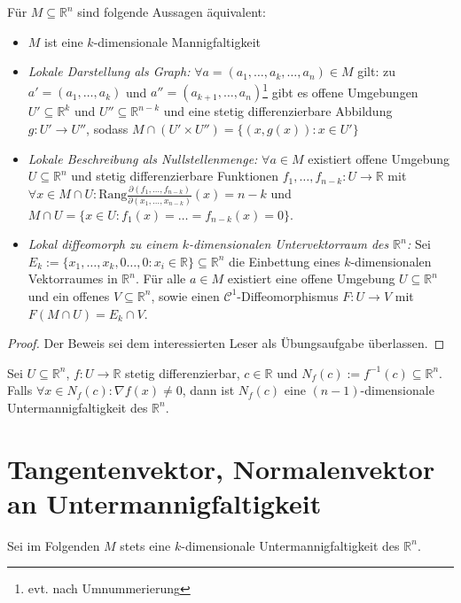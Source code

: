 \begin{theorem}
	F\"ur $M\subseteq \mathbb R^n$ sind folgende Aussagen \"aquivalent:
	
	\begin{itemize}
		\item $M$ ist eine $k$-dimensionale Mannigfaltigkeit
		\item \textit{Lokale Darstellung als Graph:} $\forall a=(a_1,\dots,a_k,\dots,a_n)\in M$ gilt: zu $a'=(a_1,\dots,a_k)$ und $a''=(a_{k+1},\dots,a_n)$\footnote{evt. nach Umnummerierung} gibt es offene Umgebungen $U'\subseteq \mathbb R^k$ und $U''\subseteq \mathbb R^{n-k}$ und eine stetig differenzierbare Abbildung $g:U'\rightarrow U''$, sodass $M\cap (U'\times U'') = \{(x,g(x)): x\in U'\}$
		\item \textit{Lokale Beschreibung als Nullstellenmenge:} $\forall a\in M$ existiert offene Umgebung $U\subseteq \mathbb R^n$ und stetig differenzierbare Funktionen $f_1,\dots,f_{n-k}:U\rightarrow \mathbb R$ mit $\forall x\in M\cap U: \text{Rang}\frac{\partial(f_1,\dots,f_{n-k})}{\partial(x_1,\dots,x_{n-k})}(x) = n-k$ und $M\cap U = \{x\in U : f_1(x) = \dots = f_{n-k}(x)=0\}$.
		\item \textit{Lokal diffeomorph zu einem $k$-dimensionalen Untervektorraum des $\mathbb R^n$:} Sei $E_k := \{x_1,\dots,x_k,0\dots,0 : x_i \in \mathbb R \}\subseteq \mathbb R^n$ die Einbettung eines $k$-dimensionalen Vektorraumes in $\mathbb R^n$. F\"ur alle $a \in M$ existiert eine offene Umgebung $U\subseteq \mathbb R^n$ und ein offenes $V\subseteq \mathbb R^n$, sowie einen $\mathcal C^1$-Diffeomorphismus $F:U\rightarrow V$ mit $F(M\cap U)=E_k\cap V$.
	\end{itemize}
\end{theorem}
\begin{proof}
	Der Beweis sei dem interessierten Leser als \"Ubungsaufgabe \"uberlassen.
\end{proof}

\begin{corollary}[Niveaumengen]
	Sei $U\subseteq \mathbb R^n$, $f:U\rightarrow \mathbb R$ stetig differenzierbar, $c\in \mathbb R$ und $N_f(c) := f^{-1}(c)\subseteq \mathbb R^n$. Falls $\forall x\in N_f(c):\nabla f(x)\neq 0$, dann ist $N_f(c)$ eine $(n-1)$-dimensionale Untermannigfaltigkeit des $\mathbb R^n$.
\end{corollary}



\section{Tangentenvektor, Normalenvektor an Untermannigfaltigkeit}
Sei im Folgenden $M$ stets eine $k$-dimensionale Untermannigfaltigkeit des $\mathbb R^n$.

